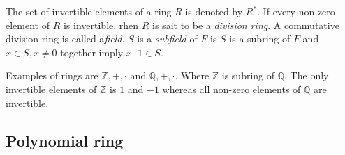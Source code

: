 The set of invertible elements of a ring $R$ is denoted by $R^*$. If every non-zero element of $R$ is invertible, rhen $R$ is sait to be a \textit{division ring}. A commutative division ring is called a\textit{field}. $S$ is a \textit{subfield} of $F$ is $S$ is a subring of $F$ and $x \in S, x \neq 0$ together imply $x^-1 \in S$.

Examples of rings are $\mathbb{Z}, +, \cdot$ and $\mathbb{Q}, +, \cdot$. Where $\mathbb{Z}$ is subring of $\mathbb{Q}$. The only invertible elements of $\mathbb{Z}$ is $1$ and $-1$ whereas all non-zero elements of $\mathbb{Q}$ are invertible.

\subsection{Polynomial ring}
